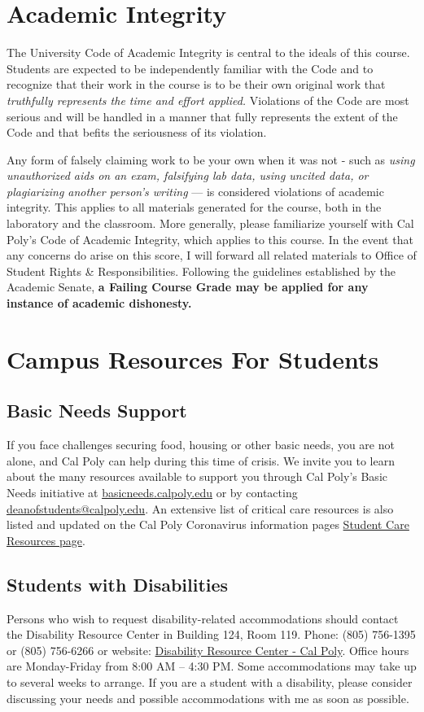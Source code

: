 \documentclass{article}
\begin{document}
\section*{Academic Integrity}
The University Code of Academic Integrity is central to the ideals of this course. Students are expected to be independently familiar with the Code and to recognize that their work in the course is to be their own original work that \emph{truthfully represents the time and effort applied.} Violations of the Code are most serious and will be handled in a manner that fully represents the extent of the Code and that befits the seriousness of its violation.

Any form of falsely claiming work to be your own when it was not - such as \emph{using unauthorized aids on an exam, falsifying lab data, using uncited data, or plagiarizing another person’s writing} — is considered violations of academic integrity. This applies to all materials generated for the course, both in the laboratory and the classroom.
More generally, please familiarize yourself with Cal Poly's Code of Academic Integrity, which applies to this course. In the  event that any concerns do arise on this score, I will forward all related materials to Office of Student Rights \& Responsibilities.  Following the guidelines established by the Academic Senate, \textbf{a Failing Course Grade may be applied for any instance of academic dishonesty.}


\section*{Campus Resources For Students}

\subsection*{Basic Needs Support}
If you face challenges securing food, housing or other basic needs, you are not alone, and Cal Poly can help during this time of crisis. We invite you to learn about the many resources available to support you through Cal Poly's Basic Needs initiative at \href{basicneeds.calpoly.edu}{basicneeds.calpoly.edu} or by contacting \href{mailto:deanofstudents@calpoly.edu}{deanofstudents@calpoly.edu}. An extensive list of critical care resources is also listed and updated on the Cal Poly Coronavirus information pages \href{https://coronavirus.calpoly.edu/student-care-resources}{Student Care Resources page}.

\subsection*{Students with Disabilities}
Persons who wish to request disability-related accommodations should contact the Disability Resource Center in Building 124, Room 119. Phone: (805) 756-1395 or (805) 756-6266 or website: \href{http://www.drc.calpoly.edu/}{Disability Resource Center - Cal Poly}. Office hours are Monday-Friday from 8:00 AM – 4:30 PM. Some accommodations may take up to several weeks to arrange. If you are a student with a disability, please consider discussing your needs and possible accommodations with me as soon as possible.
\end{document}
